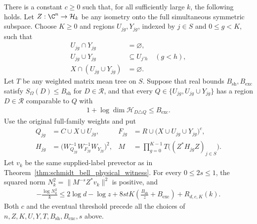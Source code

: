 \begin{theorem}
    There is a constant $c\ge0$ such that, for all sufficiently large $k$,
    the following holds. Let $Z:\C^n\to\mathcal H_k$ be any isometry onto
    the full simultaneous symmetric subspace. Choose $K\ge0$ and regions
    $U_{jg},Y_{jg}$, indexed by $j\in S$ and $0\le g<K$, such that
    \begin{align*}
        U_{jg}\cap Y_{jg}&=\varnothing,\\
        U_{jg}\cup Y_{jg}&\subseteq U_{j'h}\quad(g<h),\\
        X\cap(U_{jg}\cup Y_{jg})&=\varnothing.
    \end{align*}
    Let $T$ be any weighted matrix mean tree on $S$. Suppose that real
    bounds $B_{\mathrm{sh}},B_{\mathrm{exc}}$ satisfy
    $S_\Omega(D)\le B_{\mathrm{sh}}$ for $D\in\mathcal R$, and that every
    $Q\in\{U_{jg},U_{jg}\cup Y_{jg}\}$ has a region $D\in\mathcal R$
    comparable to $Q$ with
    \begin{align*}
        1+\log\dim\mathcal H_{D\triangle Q}\le B_{\mathrm{exc}}.
    \end{align*}
    Use the original full-family weights and put
    \begin{align*}
        Q_{jg}&=C\cup X\cup U_{jg},&
        F_{jg}&=R\cup\bigl(X\cup U_{jg}\cup Y_{jg}\bigr)^c,\\
        H_{jg}&=\bigl(W_{Q_{jg}}^{-1}W_{F_{jg}}^{-1}W_{Y_{jg}}\bigr)^2,&
        M&=\prod_{g=0}^{K-1}T\bigl((Z^*H_{jg}Z)_{j\in S}\bigr).
    \end{align*}
    Let $v_k$ be the same supplied-label prevector as in
    Theorem~\ref{thm:schmidt_bell_physical_witness}. For every $0\le2s\le1$,
    the squared norm $N_k^2=\|M^{-s}Z^*v_k\|^2$ is positive, and
    \begin{align*}
        -\frac{\log N_k^2}{k}
        \le 2\log d-\log z
            +8stK\left(\frac{B_{\mathrm{sh}}}{z}+B_{\mathrm{exc}}\right)
            +R_{d,c,K}(k).
    \end{align*}
    Both $c$ and the eventual threshold precede all the choices of
    $n,Z,K,U,Y,T,B_{\mathrm{sh}},B_{\mathrm{exc}},s$ above.
\end{theorem}
